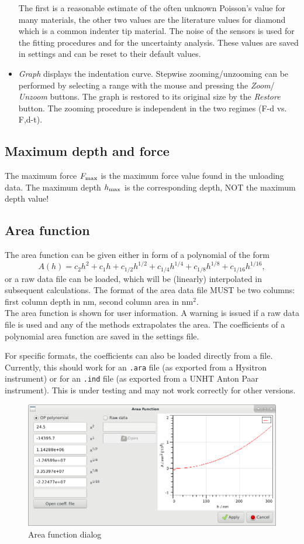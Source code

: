 \begin{itemize}
    The first is a reasonable estimate of the often unknown Poisson's value for many materials, the other two values are the literature values for diamond which is a common indenter tip material. 
    The noise of the sensors is used for the fitting procedures and for the uncertainty analysis.
    These values are saved in settings and can be reset to their default values.
\item \emph{Graph}  displays the indentation curve.  Stepwise zooming/unzooming can be performed by selecting a range with the mouse and pressing the \emph{Zoom}/ \emph{Unzoom} buttons. The graph is restored to its original size by the \emph{Restore} button.
The zooming procedure is independent in the two regimes (F-d vs. F,d-t).
\end{itemize}

\subsection{Maximum depth and force} \label{contact_max}
The maximum force $F_\mathrm{max}$ is the maximum force value found in the unloading data. The maximum depth $h_\mathrm{max}$ is the corresponding depth, NOT the maximum depth value!

\subsection{Area function} \label{area}
The area function can be given either in form of a polynomial of the form
\begin{equation} \label{eq:Aphc}
A(h) = c_2 h^2 + c_1 h + c_{1/2} h^{1/2} + c_{1/4} h^{1/4} + c_{1/8} h^{1/8} + c_{1/16} h^{1/16},
\end{equation}
or a raw data file can be loaded, which will be (linearly) interpolated in subsequent calculations. The format of the area data file MUST be two columns: first column depth in nm, second column area in nm$^2$.\\ 
The area function is shown for user information. A warning is issued if a raw data file is used and any of the methods extrapolates the area. 
The coefficients of a polynomial area function are saved in the settings file. 

For specific formats, the coefficients can also be loaded directly from a file. 
Currently, this should work for an \verb|.ara| file (as exported from a Hysitron instrument) or for an \verb|.ind| file (as exported from a UNHT Anton Paar instrument). 
This is under testing and may not work correctly for other versions. 

\begin{figure}[h]
  \centering
  \includegraphics[width=.6\textwidth]{images/screen-area}
  \caption{Area function dialog}
\end{figure}
